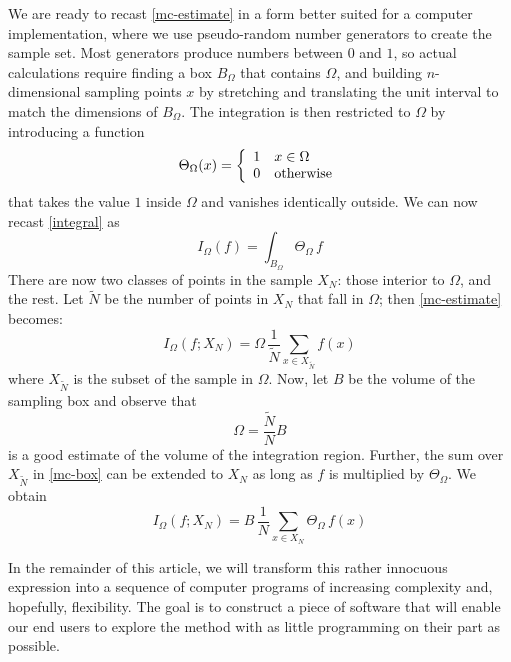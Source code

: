 We are ready to recast \eqref{mc-estimate} in a form better suited for a computer
implementation, where we use pseudo-random number generators to create the sample set. Most
generators produce numbers between $0$ and $1$, so actual calculations require finding a box
$B_{\Omega}$ that contains $\Omega$, and building $n$-dimensional sampling points $x$ by
stretching and translating the unit interval to match the dimensions of $B_{\Omega}$. The
integration is then restricted to $\Omega$ by introducing a function
%
\begin{equation}
  \Theta_{\Omega}(x)
  =
  \left\{
  \begin{array}{ll}
  1 & x \in \Omega \\
  0 & {\rm otherwise}
  \end{array}
  \right.
\label{eq:theta}
\end{equation}
%
that takes the value $1$ inside $\Omega$ and vanishes identically outside. We can now recast
\eqref{integral} as
%
\begin{equation}
  I_{\Omega} (f)
  =
  \int_{B_{\Omega}} \Theta_{\Omega} \, f
\label{eq:integral-box}
\end{equation}
%
There are now two classes of points in the sample $X_{N}$: those interior to $\Omega$, and the
rest. Let $\tilde{N}$ be the number of points in $X_{N}$ that fall in $\Omega$; then
\eqref{mc-estimate} becomes:
%
\begin{equation}
  I_{\Omega} (f; X_{N})
  =
  \Omega \, \frac{1}{\tilde{N}} \sum_{x \in X_{\tilde{N}}} f(x)
\label{eq:mc-box}
\end{equation}
%
where $X_{\tilde{N}}$ is the subset of the sample in $\Omega$. Now, let $B$ be the volume
of the sampling box and observe that
%
\begin{equation}
  \Omega
  =
  \frac{\tilde{N}}{N} B
\label{eq:volume-estimate}
\end{equation}
%
is a good estimate of the volume of the integration region. Further, the sum over
$X_{\tilde{N}}$ in \eqref{mc-box} can be extended to $X_{N}$ as long as $f$ is
multiplied by $\Theta_{\Omega}$. We obtain
%
\begin{equation}
  I_{\Omega} (f; X_{N})
  =
  B \, \frac{1}{N} \sum_{x \in X_{N}} \Theta_{\Omega} \, f(x)
\label{eq:mc}
\end{equation}
%

In the remainder of this article, we will transform this rather innocuous expression into
a sequence of computer programs of increasing complexity and, hopefully, flexibility. The
goal is to construct a piece of software that will enable our end users to explore the
method with as little programming on their part as possible.

